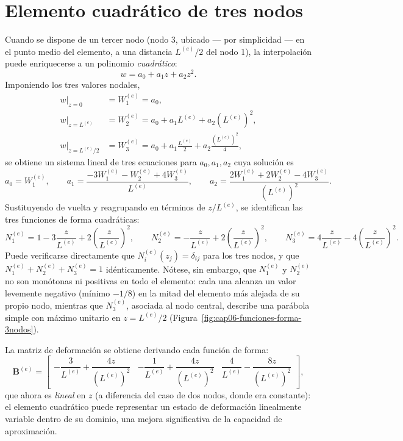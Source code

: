 \section{Elemento cuadrático de tres nodos}
\label{sec:cap06-elemento-3nodos}

Cuando se dispone de un tercer nodo (nodo 3, ubicado --- por simplicidad --- en el punto medio del elemento, a una distancia $L^{(e)}/2$ del nodo 1), la interpolación puede enriquecerse a un polinomio \emph{cuadrático}:
\[
w = a_0 + a_1 z + a_2 z^2 .
\]
Imponiendo los tres valores nodales,
\begin{align*}
w\big|_{z=0} &=W_1^{(e)}=a_0, \\
w\big|_{z=L^{(e)}} &=W_2^{(e)}=a_0+a_1L^{(e)}+a_2(L^{(e)})^2, \\
w\big|_{z=L^{(e)}/2} &=W_3^{(e)}=a_0+a_1\frac{L^{(e)}}{2}+a_2\frac{(L^{(e)})^2}{4},
\end{align*}
se obtiene un sistema lineal de tres ecuaciones para $a_0,a_1,a_2$ cuya solución es
\[
a_0=W_1^{(e)}, \qquad a_1=\frac{-3W_1^{(e)}-W_2^{(e)}+4W_3^{(e)}}{L^{(e)}}, \qquad a_2=\frac{2W_1^{(e)}+2W_2^{(e)}-4W_3^{(e)}}{(L^{(e)})^2} .
\]
Sustituyendo de vuelta y reagrupando en términos de $z/L^{(e)}$, se identifican las tres funciones de forma cuadráticas:
\[
N_1^{(e)} = 1 - 3\frac{z}{L^{(e)}} + 2\left(\frac{z}{L^{(e)}}\right)^2, \qquad
N_2^{(e)} = -\frac{z}{L^{(e)}} + 2\left(\frac{z}{L^{(e)}}\right)^2, \qquad
N_3^{(e)} = 4\frac{z}{L^{(e)}} - 4\left(\frac{z}{L^{(e)}}\right)^2 .
\]
Puede verificarse directamente que $N_i^{(e)}(z_j)=\delta_{ij}$ para los tres nodos, y que $N_1^{(e)}+N_2^{(e)}+N_3^{(e)}=1$ idénticamente. Nótese, sin embargo, que $N_1^{(e)}$ y $N_2^{(e)}$ no son monótonas ni positivas en todo el elemento: cada una alcanza un valor levemente negativo (mínimo $-1/8$) en la mitad del elemento más alejada de su propio nodo, mientras que $N_3^{(e)}$, asociada al nodo central, describe una parábola simple con máximo unitario en $z=L^{(e)}/2$ (Figura~\ref{fig:cap06-funciones-forma-3nodos}).

La matriz de deformación se obtiene derivando cada función de forma:
\[
\bm B^{(e)} = \begin{bmatrix} -\dfrac{3}{L^{(e)}}+\dfrac{4z}{(L^{(e)})^2} & -\dfrac{1}{L^{(e)}}+\dfrac{4z}{(L^{(e)})^2} & \dfrac{4}{L^{(e)}}-\dfrac{8z}{(L^{(e)})^2} \end{bmatrix} ,
\]
que ahora es \emph{lineal} en $z$ (a diferencia del caso de dos nodos, donde era constante): el elemento cuadrático puede representar un estado de deformación linealmente variable dentro de su dominio, una mejora significativa de la capacidad de aproximación.

